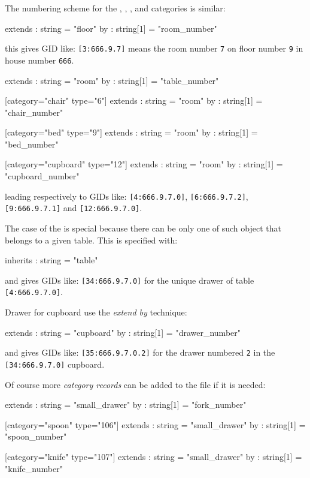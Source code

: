 The numbering scheme for the , , ,  
and   categories is similar:
\begin{ShellVerbatim}
[category="room" type="3"]
extends : string    = "floor"
by      : string[1] = "room_number"
\end{ShellVerbatim}
this gives GID like:  \verb+[3:666.9.7]+ means the room number \texttt{7}
on floor number \texttt{9} 
in house number \texttt{666}.

\begin{ShellVerbatim}
[category="table" type="4"]
extends : string    = "room"
by      : string[1] = "table_number"

[category="chair" type="6"]
extends : string    = "room"
by      : string[1] = "chair_number"

[category="bed" type="9"]
extends : string    = "room"
by      : string[1] = "bed_number"

[category="cupboard" type="12"]
extends : string    = "room"
by      : string[1] = "cupboard_number"
\end{ShellVerbatim}
leading respectively to GIDs like:
\verb+[4:666.9.7.0]+,
\verb+[6:666.9.7.2]+,
\verb+[9:666.9.7.1]+ and \verb+[12:666.9.7.0]+.

The case of the  is special because
there can be only one of such object that belongs to a given table.
This is specified with:
\begin{ShellVerbatim}
[category="small_drawer" type="34"]
inherits : string    = "table"
\end{ShellVerbatim}
and gives GIDs like: \verb+[34:666.9.7.0]+ for the unique
drawer of table \verb+[4:666.9.7.0]+.

Drawer for cupboard use the \emph{extend by} technique:
\begin{ShellVerbatim}
[category="large_drawer" type="35"]
extends : string    = "cupboard"
by      : string[1] = "drawer_number"
\end{ShellVerbatim}
and gives GIDs like: \verb+[35:666.9.7.0.2]+ for the
drawer numbered \texttt{2} in the \verb+[34:666.9.7.0]+ cupboard.

Of course more \emph{category records} can be added to the file
if it is needed:
\begin{ShellVerbatim}
[category="fork" type="105"]
extends : string    = "small_drawer"
by      : string[1] = "fork_number"

[category="spoon" type="106"]
extends : string    = "small_drawer"
by      : string[1] = "spoon_number"

[category="knife" type="107"]
extends : string    = "small_drawer"
by      : string[1] = "knife_number"
\end{ShellVerbatim}

